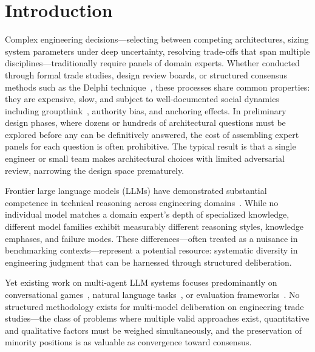 \documentclass[11pt,a4paper]{article}
\begin{document}
\onehalfspacing

\section{Introduction}
\label{sec:introduction}

Complex engineering decisions---selecting between competing architectures, sizing system parameters under deep uncertainty, resolving trade-offs that span multiple disciplines---traditionally require panels of domain experts. Whether conducted through formal trade studies, design review boards, or structured consensus methods such as the Delphi technique~\cite{linstone1975delphi}, these processes share common properties: they are expensive, slow, and subject to well-documented social dynamics including groupthink~\cite{janis1982groupthink}, authority bias, and anchoring effects. In preliminary design phases, where dozens or hundreds of architectural questions must be explored before any can be definitively answered, the cost of assembling expert panels for each question is often prohibitive. The typical result is that a single engineer or small team makes architectural choices with limited adversarial review, narrowing the design space prematurely.

Frontier large language models (LLMs) have demonstrated substantial competence in technical reasoning across engineering domains~\cite{bubeck2023sparks,openai2024gpt4}. While no individual model matches a domain expert's depth of specialized knowledge, different model families exhibit measurably different reasoning styles, knowledge emphases, and failure modes. These differences---often treated as a nuisance in benchmarking contexts---represent a potential resource: systematic diversity in engineering judgment that can be harnessed through structured deliberation.

Yet existing work on multi-agent LLM systems focuses predominantly on conversational games~\cite{du2023debate}, natural language tasks~\cite{wu2023autogen}, or evaluation frameworks~\cite{zheng2024judging}. No structured methodology exists for multi-model deliberation on engineering trade studies---the class of problems where multiple valid approaches exist, quantitative and qualitative factors must be weighed simultaneously, and the preservation of minority positions is as valuable as convergence toward consensus.
\end{document}
